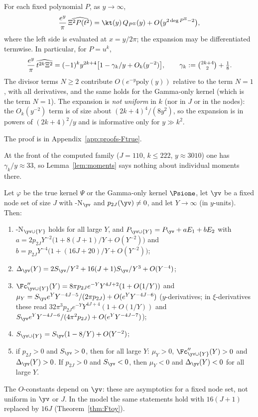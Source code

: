 \begin{lemma}\label{lem:moments}
For each fixed polynomial $P$, as $y\to\infty$,
\[
\frac{e^{y}}{\pi}\,\widehat{\Xi^2P(t^2)}=\kt(y)\,Q_{P^\Xi}(y)+O\bigl(y^{2\deg P^\Xi-2}\bigr),
\]
where the left side is evaluated at $x=y/2\pi$; the expansion may be differentiated termwise. In particular, for
$P=u^k$,
\[
\frac{e^{y}}{\pi}\,\widehat{t^{2k}\Xi^2}=(-1)^ky^{2k+4}\bigl[1-\gamma_k/y+O_k(y^{-2})\bigr],\qquad\gamma_k:=\tbinom{2k+4}{2}+\tfrac18 .
\]
The divisor terms $N\ge2$ contribute $O(e^{-y}\mathrm{poly}(y))$ relative to the term $N=1$, with all derivatives, and
the same holds for the Gamma-only kernel (which is the term $N=1$). The expansion is \emph{not uniform} in $k$ (nor
in $J$ or in the nodes): the $O_k(y^{-2})$ term is of size about $(2k+4)^4/(8y^2)$, so the expansion is in powers of
$(2k+4)^2/y$ and is informative only for $y\gg k^2$.
\end{lemma}

The proof is in Appendix~\ref{app:proofs-Ftrue}.

At the front of the computed family ($J=110$, $k\le222$, $y\approx3010$) one has $\gamma_k/y\approx33$, so
Lemma~\ref{lem:moments} says nothing about individual moments there.

\begin{theorem}\label{thm:Ftrue}
Let $\varphi$ be the true kernel $\Psi$ or the Gamma-only kernel $\Psione$, let $\yv$ be a fixed node set of size $J$ with
\hyp{N}$_{\yv}$ and $p_{2J}(\yv)\ne0$, and let $Y\to\infty$ (in $y$-units). Then:
\begin{enumerate}[label=(\alph*),leftmargin=2em]
\item \hyp{N}$_{\yv\cup\{Y\}}$ holds for all large $Y$, and $P_{\yv\cup\{Y\}}=P_{\yv}+aE_1+bE_2$ with
$a=2p_{2J}Y^{-2}\bigl(1+8(J+1)/Y+O(Y^{-2})\bigr)$ and $b=p_{2J}Y^{-4}\bigl(1+(16J+20)/Y+O(Y^{-2})\bigr)$;
\item $\Delta_{\yv}(Y)=2S_{\yv}/Y^2+16(J+1)S_{\yv}/Y^3+O(Y^{-4})$;
\item $\Fc''_{\yv\cup\{Y\}}(Y)=8\pi p_{2J}e^{-Y}Y^{4J+2}(1+O(1/Y))$ and
$\mu_Y=S_{\yv}e^{Y}Y^{-4J-5}/(2\pi p_{2J})+O(e^{Y}Y^{-4J-6})$ ($y$-derivatives; in $\xi$-derivatives these read
$32\pi^3p_{2J}e^{-Y}Y^{4J+4}(1+O(1/Y))$ and $S_{\yv}e^{Y}Y^{-4J-6}/(4\pi^2p_{2J})+O(e^YY^{-4J-7})$);
\item $S_{\yv\cup\{Y\}}=S_{\yv}(1-8/Y)+O(Y^{-2})$;
\item if $p_{2J}>0$ and $S_{\yv}>0$, then for all large $Y$: $\mu_Y>0$, $\Fc''_{\yv\cup\{Y\}}(Y)>0$ and $\Delta_{\yv}(Y)>0$. If
$p_{2J}>0$ and $S_{\yv}<0$, then $\mu_Y<0$ and $\Delta_{\yv}(Y)<0$ for all large $Y$.
\end{enumerate}
The $O$-constants depend on $\yv$: these are asymptotics for a fixed node set, not uniform in $\yv$ or $J$. In the
model the same statements hold with $16(J+1)$ replaced by $16J$ (Theorem~\ref{thm:Ftoy}).
\end{theorem}

